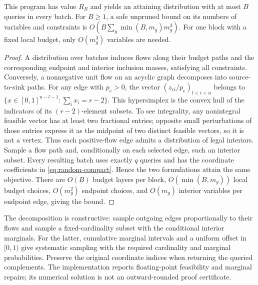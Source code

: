 \begin{proposition}
\label{prop:random-compact}
This program has value $R_B$ and yields an attaining distribution with
at most $B$ queries in every batch. For $B\geq1$, a safe unpruned bound
on its numbers of variables and constraints is
$O(B\sum_g\min(B,m_g)m_g^3)$.
For one block with a fixed local budget, only $O(m_g^3)$ variables are needed.
\end{proposition}
\begin{proof}
A distribution over batches induces flows along their budget paths and
the corresponding endpoint and interior inclusion masses, satisfying
all constraints. Conversely, a nonnegative unit flow on an acyclic graph
decomposes into source-to-sink paths. For any edge with $p_e>0$,
the vector $(z_{ei}/p_e)_{l<i<u}$ belongs to
$\{x\in[0,1]^{u-l-1}:\sum_i x_i=r-2\}$. This hypersimplex is the convex
hull of the indicators of its $(r-2)$-element subsets. To see integrality,
any nonintegral feasible vector has at least two fractional entries;
opposite small perturbations of those entries express it as the midpoint
of two distinct feasible vectors, so it is not a vertex.
Thus each positive-flow edge admits a distribution of legal interiors.
Sample a flow path and, conditionally on each selected edge, such an
interior subset. Every resulting batch uses exactly $q$ queries and
has the coordinate coefficients in \eqref{eq:random-compact}. Hence
the two formulations attain the same objective. There are $O(B)$ budget
layers per block, $O(\min(B,m_g))$ local budget choices, $O(m_g^2)$
endpoint choices, and $O(m_g)$ interior variables per endpoint edge,
giving the bound.
\end{proof}

The decomposition is constructive: sample outgoing edges proportionally
to their flows and sample a fixed-cardinality subset with the conditional
interior marginals. For the latter, cumulative marginal intervals and a
uniform offset in $[0,1)$ give systematic sampling with the required
cardinality and marginal probabilities. Preserve the original coordinate
indices when returning the queried complements. The implementation reports
floating-point feasibility and marginal repairs; its numerical solution
is not an outward-rounded proof certificate.

